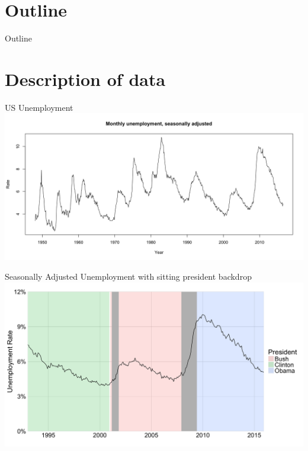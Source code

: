 \documentclass[ignorenonframetext]{beamer}
\begin{document}
\begin{frame}
	\titlepage
\end{frame}


	\section*{Outline}
	\begin{frame}{Outline}
		\tableofcontents
	\end{frame}
	
\section{Description of data}

  	\begin{frame}{US Unemployment}
		\includegraphics[width=\textwidth]{images/unemployment_total_sa}
  	\end{frame}
 
  	\begin{frame}{Seasonally Adjusted Unemployment with sitting president backdrop}
		\includegraphics[width=\linewidth]{images/presunemp}
  	\end{frame}
\end{document}
